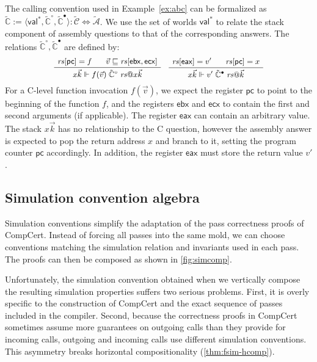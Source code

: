\documentclass[sigplan,screen]{acmart}
\newcommand{\figsize}{\small}
\newcommand{\kw}[1]{\ensuremath{ \mathsf{#1} }}
\newcommand{\que}{\circ}
\newcommand{\ans}{\bullet}
\begin{document}
\begin{example} %
The calling convention used in Example~\ref{ex:abc}
can be formalized as %
$\tilde{\mathbb{C}} :=
  \langle \kw{val}^*, \tilde{\mathbb{C}}^\que, \tilde{\mathbb{C}}^\ans \rangle :
    \tilde{\mathcal{C}} \Leftrightarrow \tilde{\mathcal{A}}$.
We use the set of worlds $\kw{val}^*$
to relate the stack component of
assembly questions to that of the corresponding answers.
The relations $\tilde{\mathbb{C}}^\que, \tilde{\mathbb{C}}^\ans$
are defined by:
\[
  \figsize
  \AxiomC{$\mathit{rs}[\kw{pc}] = f$}
  \AxiomC{\hspace{-1em} $\vec{v} \sqsubseteq \mathit{rs}[\kw{ebx}, \kw{ecx}]$}
  \BinaryInfC{$
    x \vec{k} \Vdash
    f(\vec{v}) \mathrel{\tilde{\mathbb{C}}^\que} \mathit{rs}@ x \vec{k}
  $}
  \DisplayProof
  \quad
  \AxiomC{$\mathit{rs}[\kw{eax}] = v'$}
  \AxiomC{\hspace{-1em} $\mathit{rs}[\kw{pc}] = x$}
  \BinaryInfC{$
    x \vec{k} \Vdash
    v' \mathrel{\tilde{\mathbb{C}}^\ans} \mathit{rs}@\vec{k}
  $}
  \DisplayProof
\]
For a C-level function invocation $f(\vec{v})$,
we expect the register $\kw{pc}$ to point to
the beginning of the function $f$,
and the registers $\kw{ebx}$ and $\kw{ecx}$
to contain the first and second arguments (if applicable).
The register $\kw{eax}$ can contain an arbitrary value.
The stack $x \vec{k}$ has no relationship to the C question,
however the assembly answer is expected to pop the return address $x$
and branch to it, setting the program counter $\kw{pc}$ accordingly.
In addition,
the register $\kw{eax}$
must store
the return value $v'$.
\end{example}


\subsection{Simulation convention algebra} \label{sec:mainideas:simalg} %

Simulation conventions
simplify the adaptation of the pass correctness proofs of CompCert.
Instead of forcing all passes into the same mold,
we can choose conventions matching
the simulation relation and invariants
used in each pass.
The proofs can then be composed
as shown in \autoref{fig:simcomp}.

Unfortunately,
the simulation convention obtained
when we vertically compose the resulting simulation properties
suffers two serious problems.
First,
it is overly specific to the construction of CompCert
and the exact sequence of passes included in the compiler.
Second,
because the correctness proofs in CompCert
sometimes assume more guarantees on outgoing calls
than they provide for incoming calls,
outgoing and incoming calls use different simulation conventions.
This asymmetry breaks %
horizontal compositionality (\autoref{thm:fsim-hcomp}).
\end{document}
